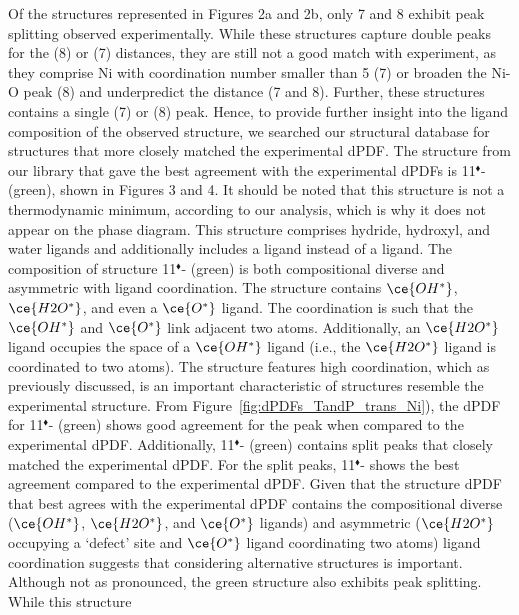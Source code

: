 



Of the structures represented in Figures 2a and 2b, only 7 and 8 exhibit peak splitting observed experimentally. While these structures capture double peaks for the  (8) or  (7) distances, they are still not a good match with experiment, as they comprise Ni with coordination number smaller than 5 (7) or broaden the Ni-O peak (8) and underpredict the  distance (7 and 8). Further, these structures contains a single  (7) or  (8) peak. Hence, to provide further insight into the ligand composition of the observed structure, we searched our structural database for structures that more closely matched the experimental dPDF. The structure from our library that gave the best agreement with the experimental dPDFs is 11$^{\blacklozenge}$- (green), shown in Figures 3 and 4. It should be noted that this structure is not a thermodynamic minimum, according to our analysis, which is why it does not appear on the phase diagram. This structure comprises hydride, hydroxyl, and water ligands and additionally includes a  ligand instead of a  ligand. The composition of structure 11$^{\blacklozenge}$- (green) is both compositional diverse and asymmetric with ligand coordination. The structure contains $\ce{OH^{*}}$, $\ce{H2O^{*}}$, and even a $\ce{O^{*}}$ ligand. The  coordination is such that the $\ce{OH^{*}}$ and $\ce{O^{*}}$ link adjacent two  atoms. Additionally, an $\ce{H2O^{*}}$ ligand occupies the space of a $\ce{OH^{*}}$ ligand (i.e., the $\ce{H2O^{*}}$ ligand is coordinated to two  atoms). The structure features high  coordination, which as previously discussed, is an important characteristic of structures resemble the experimental structure. From Figure~\ref{fig:dPDFs_TandP_trans_Ni}), the dPDF for 11$^{\blacklozenge}$- (green) shows good agreement for the  peak when compared to the experimental dPDF. Additionally, 11$^{\blacklozenge}$- (green) contains split  peaks that closely matched the experimental dPDF. For the split  peaks, 11$^{\blacklozenge}$- shows the best agreement compared to the experimental dPDF. Given that the structure dPDF that best agrees with the experimental dPDF contains the compositional diverse ($\ce{OH^{*}}$, $\ce{H2O^{*}}$, and $\ce{O^{*}}$ ligands) and asymmetric ($\ce{H2O^{*}}$ occupying a `defect' site and $\ce{O^{*}}$ ligand coordinating two  atoms) ligand coordination suggests that considering alternative structures is important. Although not as pronounced, the green structure also exhibits  peak splitting. While this structure 
